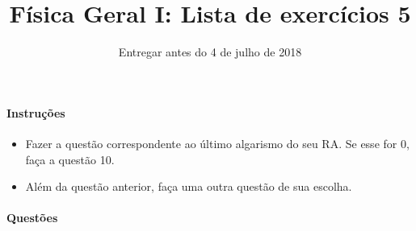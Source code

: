 \documentclass[twocolumn=on,DIV=calc]{scrartcl}
\title{Física Geral I: Lista de exercícios 5}
\author{Entregar antes do 4 de julho de 2018}
\date{}
\begin{document}
\maketitle

\paragraph{Instruções}

\begin{itemize}
\item Fazer a questão correspondente ao último algarismo do seu RA. Se
  esse for $0$, faça a questão 10.
\item Além da questão anterior, faça uma outra questão de sua escolha.
\end{itemize}

\paragraph{Questões}
\end{document}
